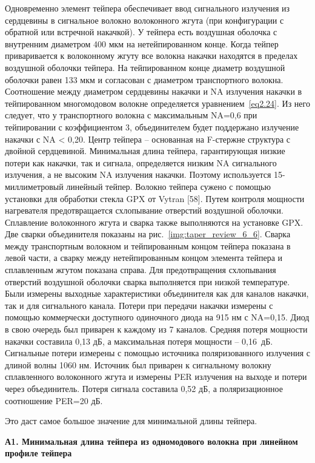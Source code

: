 Одновременно элемент тейпера обеспечивает ввод сигнального излучения из сердцевины в сигнальное волокно волоконного жгута (при конфигурации с обратной или встречной накачкой). У тейпера есть воздушная оболочка с внутренним диаметром 400 мкм на нетейпированном конце. Когда тейпер приваривается к волоконному жгуту все волокна накачки находятся в пределах воздушной оболочки тейпера. На тейпированном конце диаметр воздушной оболочки равен 133 мкм и согласован с диаметром транспортного волокна. Соотношение между диаметром сердцевины накачки и NA излучения накачки в тейпированном многомодовом волокне определяется уравнением~\eqref{eq2.24}. Из него следует, что у транспортного волокна с максимальным NA=0,6 при тейпировании с коэффициентом 3, объединителем будет поддержано излучение накачки с NA < 0,20. Центр тейпера -- основанная на F-стержне структура с двойной сердцевиной. Минимальная длина тейпера, гарантирующая низкие потери как накачки, так и сигнала, определяется низким NA сигнального излучения, а не высоким NA излучения накачки. Поэтому используется 15-миллиметровый линейный тейпер. Волокно тейпера сужено с помощью установки для обработки стекла GPX от Vytran [58]. Путем контроля мощности нагревателя предотвращается схлопывание отверстий воздушной оболочки. Сплавление волоконного жгута и сварка также выполняются на установке GPX. Две сварки объединителя показаны на рис.~\ref{img:taper_review_6_6}. Сварка между транспортным волокном и тейпированным концом тейпера показана в левой части, а сварку между нетейпированным концом элемента тейпера и сплавленным жгутом показана справа. Для предотвращения схлопывания отверстий воздушной оболочки сварка выполняется при низкой температуре. Были измерены выходные характеристики объединителя как для каналов накачки, так и для сигнального канала. Потери при передачи накачки измерены с помощью коммерчески доступного одиночного диода на 915 нм с NA=0,15. Диод в свою очередь был приварен к каждому из 7 каналов. Средняя потеря мощности накачки составила 0,13 дБ, а максимальная потеря мощности -- 0,16~дБ. Сигнальные потери измерены с помощью источника поляризованного излучения с длиной волны 1060 нм. Источник был приварен к сигнальному волокну сплавленного волоконного жгута и измерены PER излучения на выходе и потери через объединитель. Потеря сигнала составила 0,52 дБ, а поляризационное соотношение PER=20 дБ.

Это даст самое большое значение для минимальной длины тейпера.

\noindent
\textbf{А1. Минимальная длина тейпера из одномодового волокна при линейном профиле тейпера}

